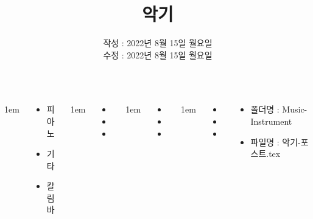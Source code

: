 \documentclass[	20pt, 
							a1paper, 
							portrait, %
							margin=0mm, %
							innermargin=10mm,  		%
							colspace=5mm, 
							subcolspace=0mm
							]{tikzposter}
\title{악기}
\author{ 	작성 : 2022년 8월 15일 월요일 \\
			수정 : 2022년 8월 15일 월요일 }
\begin{document}
	\maketitle

	\begin{columns}


			{
					\setlength{\leftmargini}{7em}
					\setlength{\labelsep} {1em}
				\begin{LARGE}
					\begin{itemize}
					\item 피아노
					\item 기타
					\item 칼림바
					\end{itemize}
				\end{LARGE}
			}





			{
					\setlength{\leftmargini}{4em}
					\setlength{\labelsep} {1em}
				\begin{LARGE}
					\begin{itemize}
					\item 
					\item 
					\item 
					\end{itemize}
				\end{LARGE}
			}


			{
					\setlength{\leftmargini}{4em}
					\setlength{\labelsep} {1em}
				\begin{LARGE}
					\begin{itemize}
					\item 
					\item 
					\item 
					\end{itemize}
				\end{LARGE}
			}
			{
					\setlength{\leftmargini}{4em}
					\setlength{\labelsep} {1em}
				\begin{LARGE}
					\begin{itemize}
					\item 
					\item 
					\item 
					\end{itemize}
				\end{LARGE}
			}

			{
				\begin{LARGE}
					\begin{itemize}
					\item 폴더명 : Music-Instrument
					\item 파일명 : 악기-포스트.tex
					\end{itemize}
				\end{LARGE}
			}


	\end{columns}
\end{document}
